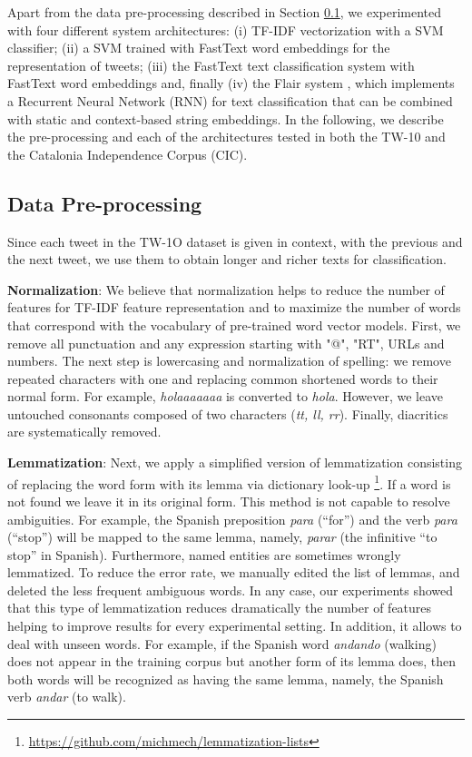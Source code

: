 \documentclass[10pt, a4paper]{article}
\begin{document}
Apart from the data pre-processing described in Section \ref{sec:data-pre-processing}, we experimented with four different system architectures: (i) TF-IDF vectorization with a SVM classifier; (ii) a SVM trained with FastText word embeddings \cite{Grave18} for the representation of tweets; (iii) the FastText text classification system \cite{joulin-etal-2017-bag} with FastText word embeddings and, finally (iv) the Flair system \cite{akbik-etal-2018-contextual}, which implements a Recurrent Neural Network (RNN) for text classification that can be combined with static and context-based string embeddings. In the following, we describe the pre-processing and each of the architectures tested in both the TW-10 and the Catalonia Independence Corpus (CIC).

\subsection{Data Pre-processing}\label{sec:data-pre-processing}

Since each tweet in the TW-1O dataset is given in context, with the previous and the next tweet, we use them to obtain longer and richer texts for classification.

\textbf{Normalization}: We believe that normalization helps to reduce the number of features for TF-IDF feature representation and to maximize the number of words that correspond with the vocabulary of pre-trained word vector models. First, we remove all punctuation and any expression starting with "@", "RT", URLs and numbers. The next step is lowercasing and normalization of spelling: we remove repeated characters with one and replacing common shortened words to their normal form. For example, \textit{holaaaaaaa} is converted to \textit{hola}. However, we leave untouched consonants composed of two characters (\emph{tt, ll, rr}). Finally, diacritics are systematically removed.

\textbf{Lemmatization}: Next, we apply a simplified version of lemmatization consisting of replacing the word form with its lemma via dictionary look-up \footnote{\url{https://github.com/michmech/lemmatization-lists}}. If a word is not found we leave it in its original form. This method is not capable to resolve ambiguities. For example, the Spanish preposition \textit{para} (``for'') and the verb \textit{para} (``stop'') will be mapped to the same lemma, namely, \textit{parar} (the infinitive ``to stop'' in Spanish). Furthermore, named entities are sometimes wrongly lemmatized. To reduce the error rate, we manually edited the list of lemmas, and deleted the less frequent ambiguous words. In any case, our experiments showed that this type of lemmatization reduces dramatically the number of features helping to improve results for every experimental setting. In addition, it allows to deal with unseen words. For example, if the Spanish word \textit{andando} (walking) does not appear in the training corpus but another form of its lemma does, then both words will be recognized as having the same lemma, namely, the Spanish verb \textit{andar} (to walk).
\end{document}

